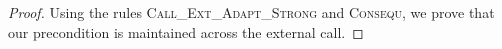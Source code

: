\begin{proof}
Using the rules \textsc{Call\_Ext\_Adapt\_Strong} and \textsc{Consequ}, we prove that our precondition is maintained across the external call.

%
%
%
%

\end{proof}
